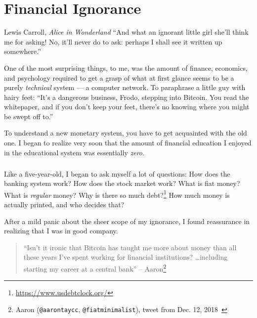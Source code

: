 \chapter{Financial Ignorance}
\label{les:8}

\begin{chapquote}{Lewis Carroll, \textit{Alice in Wonderland}}
\enquote{And what an ignorant little girl she'll think me for asking! No, it'll never
do to ask: perhaps I shall see it written up somewhere.}
\end{chapquote}

One of the most surprising things, to me, was the amount of finance,
economics, and psychology required to get a grasp of what at first
glance seems to be a purely \textit{technical} system --- a computer network.
To paraphrase a little guy with hairy feet: \enquote{It's a dangerous business,
Frodo, stepping into Bitcoin. You read the whitepaper, and if you don't
keep your feet, there's no knowing where you might be swept off to.}

To understand a new monetary system, you have to get acquainted with the
old one. I began to realize very soon that the amount of financial
education I enjoyed in the educational system was essentially \textit{zero}.

\paragraph{}
Like a five-year-old, I began to ask myself a lot of questions: How does the
banking system work? How does the stock market work? What is fiat money? What is
\textit{regular} money? Why is there so much
debt?\footnote{\url{https://www.usdebtclock.org/}} How much money is actually
printed, and who decides that?

\newpage

After a mild panic about the sheer scope of my ignorance, I found
reassurance in realizing that I was in good company.

\begin{samepage}\begin{quotation}
\enquote{Isn't it ironic that Bitcoin has taught me more about money than all these
years I've spent working for financial institutions? \ldots including starting my
career at a central bank}
\flushright -- Aaron\footnote{Aaron (\texttt{@aarontaycc}, \texttt{@fiatminimalist}), tweet from Dec.
12, 2018~\cite{aarontaycc-tweet}}
\end{quotation}\end{samepage}

